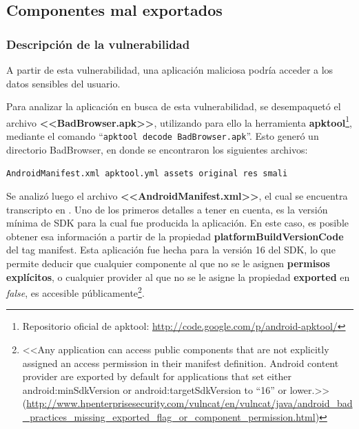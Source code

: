 \documentclass[11pt, a4paper, twoside]{article}
\begin{document}
%
%
\clearpage
\subsection{Componentes mal exportados}
\subsubsection{Descripción de la vulnerabilidad}
A partir de esta vulnerabilidad, una aplicación maliciosa podría
acceder a los datos sensibles del usuario.

Para analizar la aplicación en busca de esta vulnerabilidad, se desempaquetó el archivo \textbf{<<BadBrowser.apk>>}, utilizando para ello la herramienta \textbf{apktool}\footnote{Repositorio oficial de apktool: \url{http://code.google.com/p/android-apktool/}}, mediante el comando ``\texttt{apktool decode BadBrowser.apk}''. Esto generó un directorio BadBrowser, en donde se encontraron los siguientes archivos:
\begin{center}
\texttt{AndroidManifest.xml apktool.yml assets original res smali}
\end{center}

Se analizó luego el archivo \textbf{<<AndroidManifest.xml>>}, el cual se encuentra transcripto en . Uno de los primeros detalles a tener en cuenta, es la versión mínima de SDK para la cual fue producida la aplicación. En este caso, es posible obtener esa información a partir de la propiedad {\color{red}\textbf{platformBuildVersionCode}} del tag manifest. Esta aplicación fue hecha para la versión 16 del SDK, lo que permite deducir que cualquier componente al que no se le asignen \textbf{permisos explícitos}, o cualquier provider al que no se le asigne la propiedad \textbf{exported} en \emph{false}, es accesible públicamente\footnote{<<Any application can access public components that are not explicitly assigned an access permission in their manifest definition. Android content provider are exported by default for applications that set either android:minSdkVersion or android:targetSdkVersion to ``16'' or lower.>> (\url{http://www.hpenterprisesecurity.com/vulncat/en/vulncat/java/android_bad_practices_missing_exported_flag_or_component_permission.html})}.
\end{document}

